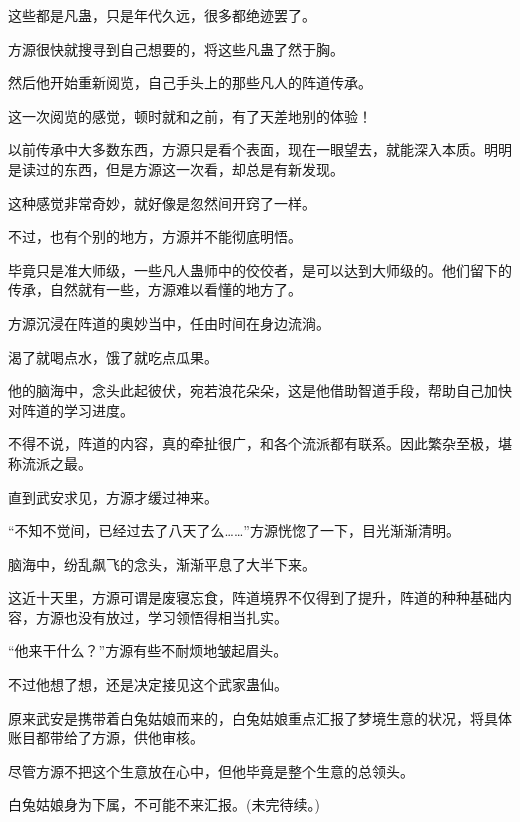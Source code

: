 \begin{this_body}
这些都是凡蛊，只是年代久远，很多都绝迹罢了。

方源很快就搜寻到自己想要的，将这些凡蛊了然于胸。

然后他开始重新阅览，自己手头上的那些凡人的阵道传承。

这一次阅览的感觉，顿时就和之前，有了天差地别的体验！

以前传承中大多数东西，方源只是看个表面，现在一眼望去，就能深入本质。明明是读过的东西，但是方源这一次看，却总是有新发现。

这种感觉非常奇妙，就好像是忽然间开窍了一样。

不过，也有个别的地方，方源并不能彻底明悟。

毕竟只是准大师级，一些凡人蛊师中的佼佼者，是可以达到大师级的。他们留下的传承，自然就有一些，方源难以看懂的地方了。

方源沉浸在阵道的奥妙当中，任由时间在身边流淌。

渴了就喝点水，饿了就吃点瓜果。

他的脑海中，念头此起彼伏，宛若浪花朵朵，这是他借助智道手段，帮助自己加快对阵道的学习进度。

不得不说，阵道的内容，真的牵扯很广，和各个流派都有联系。因此繁杂至极，堪称流派之最。

直到武安求见，方源才缓过神来。

“不知不觉间，已经过去了八天了么……”方源恍惚了一下，目光渐渐清明。

脑海中，纷乱飙飞的念头，渐渐平息了大半下来。

这近十天里，方源可谓是废寝忘食，阵道境界不仅得到了提升，阵道的种种基础内容，方源也没有放过，学习领悟得相当扎实。

“他来干什么？”方源有些不耐烦地皱起眉头。

不过他想了想，还是决定接见这个武家蛊仙。

原来武安是携带着白兔姑娘而来的，白兔姑娘重点汇报了梦境生意的状况，将具体账目都带给了方源，供他审核。

尽管方源不把这个生意放在心中，但他毕竟是整个生意的总领头。

白兔姑娘身为下属，不可能不来汇报。(未完待续。)

\end{this_body}

